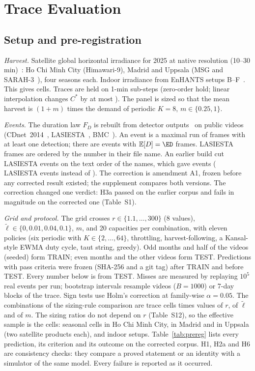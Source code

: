 \documentclass[lettersize,journal]{IEEEtran}
\theoremstyle{definition}
\theoremstyle{remark}
\newcommand{\lt}{\tilde{\ell}}
\newcommand{\E}{\mathbb{E}}
\begin{document}
\section{Trace Evaluation}\label{sec:eval}
\subsection{Setup and pre-registration}\label{sec:setup}
\emph{Harvest.} Satellite global horizontal irradiance for 2025 at native resolution (10--30\,min)~\cite{zippenfeld2023openmeteo}: Ho Chi Minh City (Himawari-9), Madrid and Uppsala (MSG and SARAH-3~\cite{pfeifroth2023sarah3}), four seasons each. Indoor irradiance from EnHANTS setups B--F~\cite{enhants2011dataset}. This gives \nTraceCells{} cells. Traces are held on 1-min sub-steps (zero-order hold; linear interpolation changes $C^*$ by at most \interpMax). The panel is sized so that the mean harvest is $(1+m)$ times the demand of periodic $K=8$, $m\in\{0.25,1\}$.

\emph{Events.} The duration law $F_D$ is rebuilt from detector outputs~\cite{ultralytics_yolo} on \nVid{} public videos (CDnet~2014~\cite{wang2014cdnet}, LASIESTA~\cite{cuevas2016lasiesta}, BMC~\cite{vacavant2013bmc}). An event is a maximal run of frames with at least one detection; there are \nEv{} events with $\E[D]=\ED$ frames. LASIESTA frames are ordered by the number in their file name. An earlier build cut LASIESTA events on the text order of the names, which gave \VoneNev{} events (\VoneLas{} LASIESTA events instead of \VtwoLas). The correction is amendment A1, frozen before any corrected result existed; the supplement compares both versions. The correction changed one verdict: H3a passed on the earlier corpus and fails in magnitude on the corrected one (Table~S1).

\emph{Grid and protocol.} The grid crosses $r\in\{1.1,\dots,300\}$ (8 values), $\lt\in\{0,0.01,0.04,0.1\}$, $m$, and 20 capacities per combination, with eleven policies (six periodic with $K\in\{2,\dots,64\}$, throttling, harvest-following, a Kansal-style EWMA duty cycle, taut string, greedy). Odd months and half of the videos (seeded) form TRAIN; even months and the other videos form TEST. Predictions with pass criteria were frozen (SHA-256 and a git tag) after TRAIN and before TEST. Every number below is from TEST. Misses are measured by replaying $10^5$ real events per run; bootstrap intervals resample videos ($B=1000$) or 7-day blocks of the trace. Sign tests use Holm's correction at family-wise $\alpha=0.05$. The \nCombos{} combinations of the sizing-rule comparison are \nCells{} trace cells times \nRgrid{} values of $r$, \nLgrid{} of $\lt$ and \nMgrid{} of $m$. The sizing ratios do not depend on $r$ (Table~S12), so the effective sample is the \nCells{} cells: \nCellHCMC{} seasonal cells in Ho Chi Minh City, \nCellMad{} in Madrid and \nCellUpp{} in Uppsala (two satellite products each), and \nCellIn{} indoor setups. Table~\ref{tab:prereg} lists every prediction, its criterion and its outcome on the corrected corpus. H1, H2a and H6 are consistency checks: they compare a proved statement or an identity with a simulator of the same model. Every failure is reported as it occurred.
\end{document}
